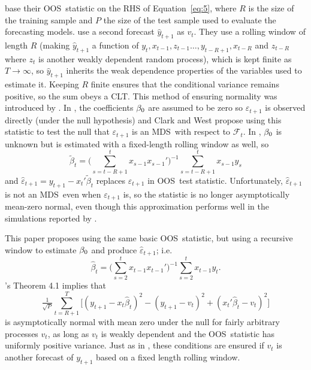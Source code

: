 \documentclass[12pt,fleqn]{article}
\newcommand\citepos[2][]{\citeauthor{#2}'s \citeyearpar[#1]{#2}}
\theoremstyle{definition}
\newcommand{\btrue}[1][]{\if#1*\hat\beta_{T+1}\else\beta_0\fi}
\newcommand{\osum}[1]{\sum_{#1=R+1}^T}
\newcommand{\oclt}[1]{\tfrac{1}{\sqrt{P}} \osum{#1}}
\newcommand{\clt}{CLT}
\newcommand{\mds}{MDS}
\newcommand{\oos}{OOS}
\begin{document}
\citet{ClW:06,ClW:07} base their \oos\ statistic on the RHS of
Equation~\eqref{eq:5}, where $R$ is the size of the training sample and $P$
the size of the test sample used to evaluate the forecasting models.
\citet{ClW:06} use a second forecast $\hat{y}_{t+1}$ as $v_t$.  They
use a rolling window of length $R$ (making $\hat{y}_{t+1}$ a
function of $y_t, x_{t-1}, z_{t-1} \dots, y_{t-R+1}, x_{t-R}$ and
$z_{t-R}$ where $z_t$ is another weakly dependent random process),
which is kept finite as $T \to \infty$, so $\hat{y}_{t+1}$ inherits
the weak dependence properties of the variables used to estimate it.
Keeping $R$ finite ensures that the conditional variance remains
positive, so the sum obeys a \clt.  This method of ensuring normality
was introduced by \citet{GiW:06}.  In \citet{ClW:06}, the coefficients $\btrue$ are
assumed to be zero so $\varepsilon_{t+1}$ is observed directly (under
the null hypothesis) and Clark and West propose using this statistic
to test the null that $\varepsilon_{t+1}$ is an \mds\ with respect to
$\mathcal{F}_t$.  In \citet{ClW:07}, $\btrue$ is unknown but is
estimated with a fixed-length rolling window as well, so
\begin{equation*}
  \tilde{\beta}_t = \Big(\sum_{s=t-R+1}^t x_{s-1} x_{s-1}'\Big)^{-1}
  \sum_{s=t-R+1}^t x_{s-1} y_s
\end{equation*}
and $\hat{\varepsilon}_{t+1} = y_{t+1} - x_t'\tilde{\beta}_t$ replaces
$\varepsilon_{t+1}$ in \oos\ test statistic.  Unfortunately,
$\hat{\varepsilon}_{t+1}$ is not an \mds\ even when
$\varepsilon_{t+1}$ is, so the statistic is no longer asymptotically
mean-zero normal, even though this approximation performs well in the
simulations reported by \citet{ClW:07}.

This paper proposes using the same basic \oos\ statistic, 
but using a recursive window to estimate $\btrue$ and produce
$\hat{\varepsilon}_{t+1}$; i.e.
\begin{equation}
  \label{eq:8}
  \hat{\beta}_t = \Big(\sum_{s=2}^{t} x_{t-1} x_{t-1}'\Big)^{-1}
  \sum_{s=2}^t x_{t-1} y_t.
\end{equation}
\citepos{Wes:96} Theorem 4.1 implies that
\begin{equation*}
  \oclt{t} \Big[(y_{t+1} -
  x_t\hat{\beta}_t)^2 - (y_{t+1} - v_t)^2 + (x_t'\hat{\beta}_t - v_t)^2 \Big]
\end{equation*}
is asymptotically normal with mean zero under the null for fairly
arbitrary processes $v_t$, as long as $v_t$ is weakly dependent and
the \oos\ statistic has uniformly positive variance.  Just as in
\citet{ClW:06}, these conditions are ensured if $v_t$ is another
forecast of $y_{t+1}$ based on a fixed length rolling window.
\end{document}
